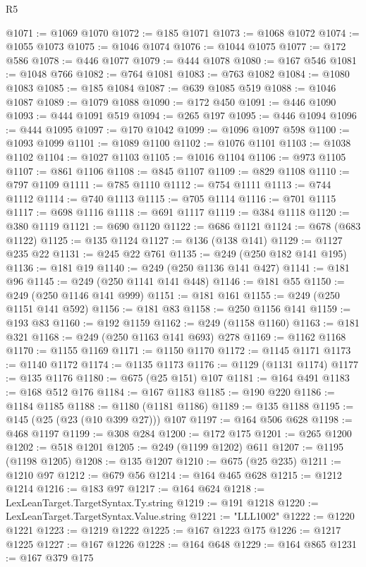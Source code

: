 \begin{lexlean}{R5}
\begin{coremodule}
@1071 := @1069 @1070
@1072 := @185 @1071
@1073 := @1068 @1072
@1074 := @1055 @1073
@1075 := @1046 @1074
@1076 := @1044 @1075
@1077 := @172 @586
@1078 := @446 @1077
@1079 := @444 @1078
@1080 := @167 @546
@1081 := @1048 @766
@1082 := @764 @1081
@1083 := @763 @1082
@1084 := @1080 @1083
@1085 := @185 @1084
@1087 := @639 @1085 @519
@1088 := @1046 @1087
@1089 := @1079 @1088
@1090 := @172 @450
@1091 := @446 @1090
@1093 := @444 @1091 @519
@1094 := @265 @197
@1095 := @446 @1094
@1096 := @444 @1095
@1097 := @170 @1042
@1099 := @1096 @1097 @598
@1100 := @1093 @1099
@1101 := @1089 @1100
@1102 := @1076 @1101
@1103 := @1038 @1102
@1104 := @1027 @1103
@1105 := @1016 @1104
@1106 := @973 @1105
@1107 := @861 @1106
@1108 := @845 @1107
@1109 := @829 @1108
@1110 := @797 @1109
@1111 := @785 @1110
@1112 := @754 @1111
@1113 := @744 @1112
@1114 := @740 @1113
@1115 := @705 @1114
@1116 := @701 @1115
@1117 := @698 @1116
@1118 := @691 @1117
@1119 := @384 @1118
@1120 := @380 @1119
@1121 := @690 @1120
@1122 := @686 @1121
@1124 := @678 (@683 @1122)
@1125 := @135 @1124
@1127 := @136 (@138 @141)
@1129 := @1127 @235 @22
@1131 := @245 @22 @761
@1135 := @249 (@250 @182 @141 @195)
@1136 := @181 @19
@1140 := @249 (@250 @1136 @141 @427)
@1141 := @181 @96
@1145 := @249 (@250 @1141 @141 @448)
@1146 := @181 @55
@1150 := @249 (@250 @1146 @141 @999)
@1151 := @181 @161
@1155 := @249 (@250 @1151 @141 @592)
@1156 := @181 @83
@1158 := @250 @1156 @141
@1159 := @193 @83
@1160 := @192 @1159
@1162 := @249 (@1158 @1160)
@1163 := @181 @321
@1168 := @249 (@250 @1163 @141 @693) @278
@1169 := @1162 @1168
@1170 := @1155 @1169
@1171 := @1150 @1170
@1172 := @1145 @1171
@1173 := @1140 @1172
@1174 := @1135 @1173
@1176 := @1129 (@1131 @1174)
@1177 := @135 @1176
@1180 := @675 (@25 @151) @107
@1181 := @164 @491
@1183 := @168 @512 @176
@1184 := @167 @1183
@1185 := @190 @220
@1186 := @1184 @1185
@1188 := @1180 (@1181 @1186)
@1189 := @135 @1188
@1195 := @145 (@25 (@23 (@10 @399 @27))) @107
@1197 := @164 @506 @628
@1198 := @468 @1197
@1199 := @308 @284
@1200 := @172 @175
@1201 := @265 @1200
@1202 := @518 @1201
@1205 := @249 (@1199 @1202) @611
@1207 := @1195 (@1198 @1205)
@1208 := @135 @1207
@1210 := @675 (@25 @235)
@1211 := @1210 @97
@1212 := @679 @56
@1214 := @164 @465 @628
@1215 := @1212 @1214
@1216 := @183 @97
@1217 := @164 @624
@1218 := LexLeanTarget.TargetSyntax.Ty.string
@1219 := @191 @1218
@1220 := LexLeanTarget.TargetSyntax.Value.string
@1221 := "LLL1002"
@1222 := @1220 @1221
@1223 := @1219 @1222
@1225 := @167 @1223 @175
@1226 := @1217 @1225
@1227 := @167 @1226
@1228 := @164 @648
@1229 := @164 @865
@1231 := @167 @379 @175

\end{coremodule}
\end{lexlean}
